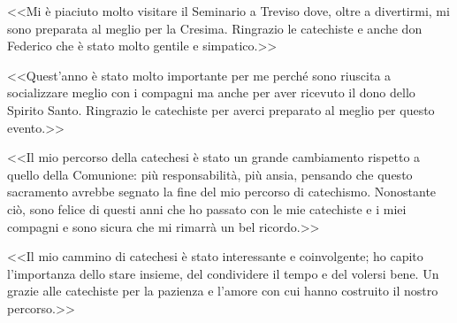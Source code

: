 <<Mi è piaciuto molto visitare il Seminario a Treviso dove, oltre a divertirmi, mi sono preparata al meglio per la Cresima. Ringrazio le catechiste e anche don Federico che è stato molto gentile e simpatico.>>

<<Quest'anno è stato molto importante per me perché sono riuscita a socializzare meglio con i compagni ma anche per aver ricevuto il dono dello Spirito Santo. Ringrazio le catechiste per averci preparato al meglio per questo evento.>>

<<Il mio percorso della catechesi è stato un grande cambiamento rispetto a quello della Comunione: più responsabilità, più ansia, pensando che questo sacramento avrebbe segnato la fine del mio percorso di catechismo. Nonostante ciò, sono felice di questi anni che ho passato con le mie catechiste e i miei compagni e sono sicura che mi rimarrà un bel ricordo.>>

<<Il mio cammino di catechesi è stato interessante e coinvolgente; ho capito l'importanza dello stare insieme, del condividere il tempo e del volersi bene. Un grazie alle catechiste per la pazienza e l'amore con cui hanno costruito il nostro percorso.>>


